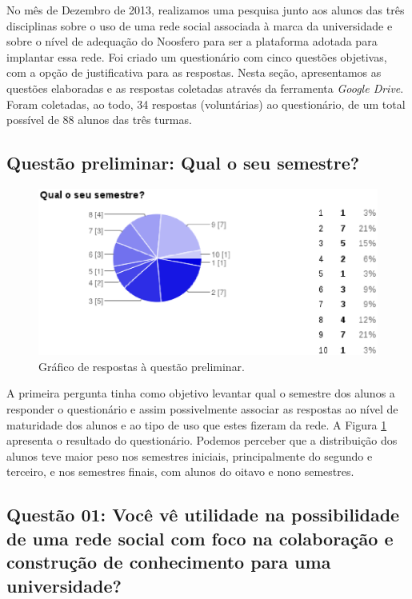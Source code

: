 No mês de Dezembro de 2013, realizamos uma pesquisa junto aos alunos das três
disciplinas sobre o uso de uma rede social associada à marca da universidade
e sobre o nível de adequação do Noosfero para ser a plataforma adotada para
implantar essa rede.
%
Foi criado um questionário com cinco questões objetivas, com a opção de
justificativa para as respostas.
%
Nesta seção, apresentamos as questões elaboradas e as respostas coletadas
através da ferramenta \textit{Google Drive}. Foram coletadas, ao todo,
34 respostas (voluntárias) ao questionário, de um total possível de 88 alunos
das três turmas.

\subsection*{Questão preliminar: Qual o seu semestre?}

\begin{figure}[h!]
    \centering
    \includegraphics[keepaspectratio=true,scale=0.6]
      {figuras/p0.eps}
    \caption{Gráfico de respostas à questão preliminar.}
    \label{response:0}
\end{figure}

A primeira pergunta tinha como objetivo levantar qual o semestre dos alunos
a responder o questionário e assim possivelmente associar as respostas
ao nível de maturidade dos alunos e ao tipo de uso que estes fizeram da rede.
%
A Figura \ref{response:0} apresenta o resultado do questionário. Podemos perceber
que a distribuição dos alunos teve maior peso nos semestres iniciais,
principalmente do segundo e terceiro, e nos semestres finais, com alunos
do oitavo e nono semestres.

\subsection*{Questão 01: Você vê utilidade na possibilidade de uma rede social
com foco na colaboração e construção de conhecimento para uma universidade?}

